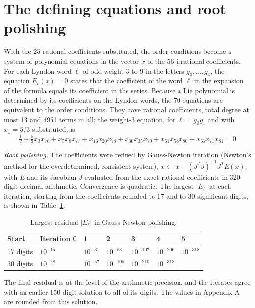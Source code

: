 \documentclass[12pt]{article}
\begin{document}
\section*{The defining equations and root polishing}

With the 25 rational coefficients substituted, the order conditions become a system of polynomial equations in the vector $x$ of the 56 irrational coefficients. For each Lyndon word $\ell$ of odd weight 3 to 9 in the letters $g_0,\ldots,g_4$, the equation $E_\ell(x)=0$ states that the coefficient of the word $\ell$ in the expansion of the formula equals its coefficient in the series. Because a Lie polynomial is determined by its coefficients on the Lyndon words, the 70 equations are equivalent to the order conditions. They have rational coefficients, total degree at most 13 and 4951 terms in all; the weight-3 equation, for $\ell=g_0g_1$ and with $x_1=5/3$ substituted, is
\begin{equation}
\tfrac{1}{2} +\tfrac{5}{3}x_{3}x_{76} +x_{5}x_{8}x_{77} +x_{16}x_{20}x_{78} +x_{30}x_{35}x_{79} +x_{51}x_{58}x_{80} +x_{63}x_{71}x_{81}=0\label{eq:e1}
\end{equation}

\emph{Root polishing.} The coefficients were refined by Gauss-Newton iteration (Newton's method for the overdetermined, consistent system), $x\leftarrow x-(J^{T}J)^{-1}J^{T}E(x)$, with $E$ and its Jacobian $J$ evaluated from the exact rational coefficients in 320-digit decimal arithmetic. Convergence is quadratic. The largest $|E_\ell|$ at each iteration, starting from the coefficients rounded to 17 and to 30 significant digits, is shown in Table~\ref{tab:polish}.

\begin{table}[H]
\centering\footnotesize
\caption{Largest residual $|E_\ell|$ in Gauss-Newton polishing.}\label{tab:polish}
\begin{tabular}{lllllll}
\hline
Start & Iteration 0 & 1 & 2 & 3 & 4 & 5 \\ \hline
17 digits & $10^{-15}$ & $10^{-31}$ & $10^{-53}$ & $10^{-107}$ & $10^{-206}$ & $10^{-318}$ \\
30 digits & $10^{-28}$ & $10^{-57}$ & $10^{-105}$ & $10^{-210}$ & $10^{-318}$ &  \\ \hline
\end{tabular}
\end{table}

The final residual is at the level of the arithmetic precision, and the iterates agree with an earlier 150-digit solution to all of its digits. The values in Appendix A are rounded from this solution.
\end{document}
